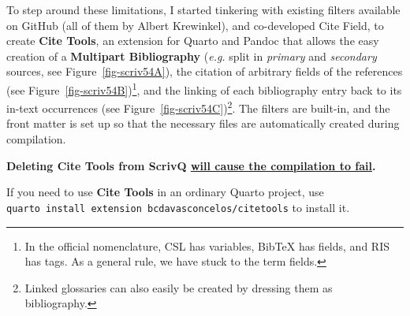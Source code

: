 \documentclass[
  12pt,
  a4paper,
  oneside,
  titlepage,
  toclink=all,
  toc=bibliography]{scrbook}
\theoremstyle{definition}
\theoremstyle{plain}
\theoremstyle{plain}
\theoremstyle{plain}
\theoremstyle{plain}
\theoremstyle{definition}
\theoremstyle{definition}
\theoremstyle{plain}
\theoremstyle{remark}
\begin{document}
To step around these limitations, I started tinkering with existing
filters available on GitHub (all of them by Albert Krewinkel), and
co-developed Cite Field, to create \textbf{Cite Tools}, an extension for
Quarto and Pandoc that allows the easy creation of a \textbf{Multipart
Bibliography} (\emph{e.g.} split in \emph{primary} and \emph{secondary}
sources, see
\protect\hypertarget{cite_77}{}{\label{cite_77}Figure~\ref{fig-scriv54A}}),
the citation of arbitrary fields of the references (see
\protect\hypertarget{cite_78}{}{\label{cite_78}Figure~\ref{fig-scriv54B}})\footnote{In
  the official nomenclature, CSL has variables, BibTeX has fields, and
  RIS has tags. As a general rule, we have stuck to the term fields.},
and the linking of each bibliography entry back to its in-text
occurrences (see
\protect\hypertarget{cite_79}{}{\label{cite_79}Figure~\ref{fig-scriv54C}})\footnote{Linked
  glossaries can also easily be created by dressing them as
  bibliography.}. The filters are built-in, and the front matter is set
up so that the necessary files are automatically created during
compilation.

\begin{tcolorbox}[enhanced jigsaw, left=2mm, colframe=quarto-callout-warning-color-frame, colback=white, opacityback=0, breakable, toprule=.15mm, arc=.35mm, rightrule=.15mm, bottomrule=.15mm, leftrule=.75mm]
\begin{minipage}[t]{5.5mm}
\textcolor{quarto-callout-warning-color}{\faExclamationTriangle}
\end{minipage}%
\begin{minipage}[t]{\textwidth - 5.5mm}

\textbf{Deleting Cite Tools from ScrivQ \ul{will cause the compilation
to fail}.}\vspace{2mm}

\end{minipage}%
\end{tcolorbox}

\begin{tcolorbox}[enhanced jigsaw, left=2mm, colframe=quarto-callout-tip-color-frame, colback=white, opacityback=0, breakable, toprule=.15mm, arc=.35mm, rightrule=.15mm, bottomrule=.15mm, leftrule=.75mm]
\begin{minipage}[t]{5.5mm}
\textcolor{quarto-callout-tip-color}{\faLightbulb}
\end{minipage}%
\begin{minipage}[t]{\textwidth - 5.5mm}

If you need to use \textbf{Cite Tools }in an ordinary Quarto project,
use \texttt{quarto\ install\ extension\ bcdavasconcelos/citetools} to
install it.

\end{minipage}%
\end{tcolorbox}
\end{document}
